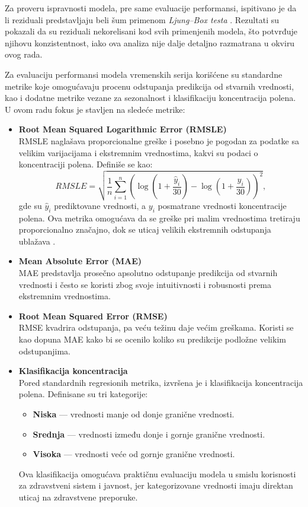 \documentclass[12pt]{article}
\begin{document}
Za proveru ispravnosti modela, pre same evaluacije performansi, ispitivano je da li reziduali predstavljaju beli šum primenom \textit{Ljung–Box testa} \cite{ljung1978}. Rezultati su pokazali da su reziduali nekorelisani kod svih primenjenih modela, što potvrđuje njihovu konzistentnost, iako ova analiza nije dalje detaljno razmatrana u okviru ovog rada.

Za evaluaciju performansi modela vremenskih serija korišćene su standardne metrike koje omogućavaju procenu odstupanja predikcija od stvarnih vrednosti, kao i dodatne metrike vezane za sezonalnost i klasifikaciju koncentracija polena. U ovom radu fokus je stavljen na sledeće metrike:

\begin{itemize}
    \item \textbf{Root Mean Squared Logarithmic Error (RMSLE)} \\
    RMSLE naglašava proporcionalne greške i posebno je pogodan za podatke sa velikim varijacijama i ekstremnim vrednostima, kakvi su podaci o koncentraciji polena. Definiše se kao:
    \[
    RMSLE = \sqrt{ \frac{1}{n} \sum_{i=1}^{n} ( \log(1 + \frac{\hat{y}_i}{30}) - \log(1 + \frac{y_i}{30}) )^2 },
    \]
    gde su $\hat{y}_i$ prediktovane vrednosti, a $y_i$ posmatrane vrednosti koncentracije polena. Ova metrika omogućava da se greške pri malim vrednostima tretiraju proporcionalno značajno, dok se uticaj velikih ekstremnih odstupanja ublažava \cite{brockwell2002,hyndman2018forecasting}.

    \item \textbf{Mean Absolute Error (MAE)} \\
    MAE predstavlja prosečno apsolutno odstupanje predikcija od stvarnih vrednosti i često se koristi zbog svoje intuitivnosti i robusnosti prema ekstremnim vrednostima.

    \item \textbf{Root Mean Squared Error (RMSE)} \\
    RMSE kvadrira odstupanja, pa veću težinu daje većim greškama. Koristi se kao dopuna MAE kako bi se ocenilo koliko su predikcije podložne velikim odstupanjima.
    
    \item \textbf{Klasifikacija koncentracija} \\
    Pored standardnih regresionih metrika, izvršena je i klasifikacija koncentracija polena. Definisane su tri kategorije:
    \begin{itemize}
        \item \textbf{Niska} — vrednosti manje od donje granične vrednosti.
        \item \textbf{Srednja} — vrednosti između donje i gornje granične vrednosti.
        \item \textbf{Visoka} — vrednosti veće od gornje granične vrednosti.
    \end{itemize}
    Ova klasifikacija omogućava praktičnu evaluaciju modela u smislu korisnosti za zdravstveni sistem i javnost, jer kategorizovane vrednosti imaju direktan uticaj na zdravstvene preporuke.


\end{itemize}
\end{document}

